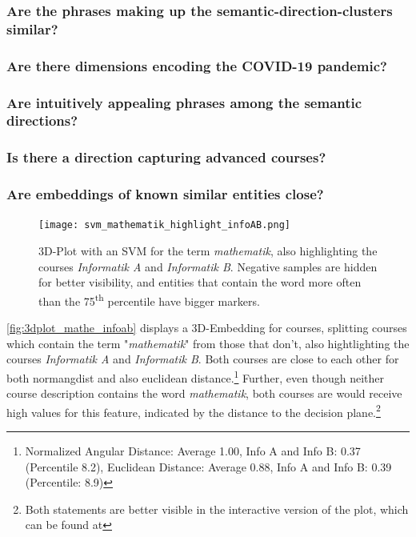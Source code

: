 \subsubsection{Are the phrases making up the semantic-direction-clusters similar?}


\subsubsection{Are there dimensions encoding the COVID-19 pandemic?}


\subsubsection{Are intuitively appealing phrases among the semantic directions?}


\subsubsection{Is there a direction capturing advanced courses?}


\subsubsection{Are embeddings of known similar entities close?}

\begin{figure}[H]
	\centering
	\texttt{[image: svm\_mathematik\_highlight\_infoAB.png]}
	\caption[3D-Plot with an SVM for the term \textit{mathematik}]{
		\label{fig:3dplot_mathe_infoab}
		3D-Plot with an SVM for the term \textit{mathematik}, also highlighting the courses \textit{Informatik A} and \textit{Informatik B}. Negative samples are hidden for better visibility, and entities that contain the word more often than the 75\textsuperscript{th} percentile have bigger markers.
	}
\end{figure}

\autoref{fig:3dplot_mathe_infoab} displays a 3D-Embedding for courses, splitting courses which contain the term "\textit{mathematik}" from those that don't, also hightlighting the courses \textit{Informatik A} and \textit{Informatik B}. Both courses are close to each other for both \gls{normangdist} and also euclidean distance.\footnote{Normalized Angular Distance: Average 1.00, Info A and Info B: 0.37 (Percentile 8.2), Euclidean Distance: Average 0.88, Info A and Info B: 0.39 (Percentile: 8.9)}
Further, even though neither course description contains the word \textit{mathematik}, both courses are would receive high values for this feature, indicated by the distance to the decision plane.\footnote{Both statements are better visible in the interactive version of the plot, which can be found at }

